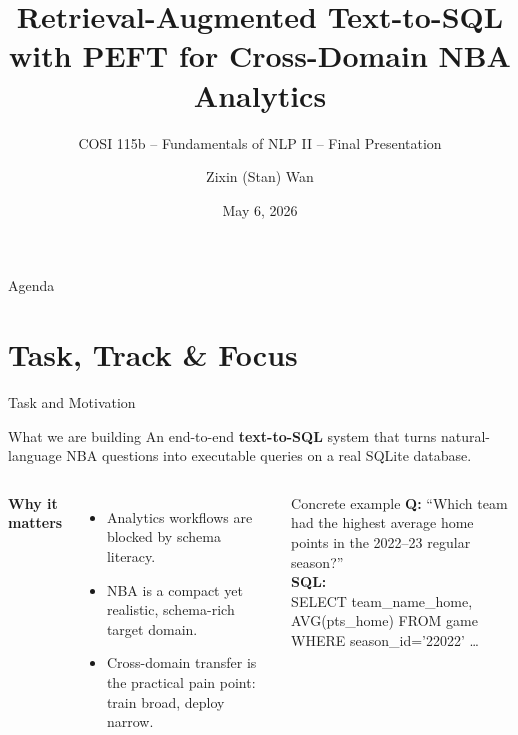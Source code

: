 \documentclass[aspectratio=169,11pt]{beamer}
\title{Retrieval-Augmented Text-to-SQL with PEFT for Cross-Domain NBA Analytics}
\subtitle{COSI 115b -- Fundamentals of NLP II -- Final Presentation}
\author{Zixin (Stan) Wan}
\institute{Brandeis University}
\date{May 6, 2026}
\begin{document}
\begin{frame}[plain]
  \titlepage
\end{frame}

\begin{frame}{Agenda}
  \tableofcontents[hideallsubsections]
\end{frame}

\section{Task, Track \& Focus}

\begin{frame}{Task and Motivation}
  \begin{block}{What we are building}
    An end-to-end \textbf{text-to-SQL} system that turns natural-language
    NBA questions into executable queries on a real SQLite database.
  \end{block}

  \begin{columns}[T,onlytextwidth]
      \textbf{Why it matters}
      \begin{itemize}
        \item Analytics workflows are blocked by schema literacy.
        \item NBA is a compact yet realistic, schema-rich target domain.
        \item Cross-domain transfer is the practical pain point: train broad,
              deploy narrow.
      \end{itemize}
      \begin{exampleblock}{Concrete example}
        \textbf{Q:} ``Which team had the highest average home points
        in the 2022--23 regular season?''\\[3pt]
        \textbf{SQL:}\\
        {\footnotesize\ttfamily SELECT team\_name\_home, AVG(pts\_home)
          FROM game WHERE season\_id='22022' \dots}
      \end{exampleblock}
  \end{columns}
\end{frame}
\end{document}
